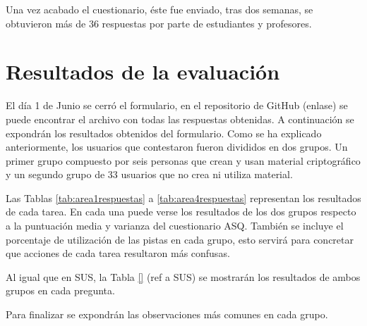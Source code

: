 Una vez acabado el cuestionario, éste fue enviado, tras dos semanas, se obtuvieron más de 36 respuestas por parte de estudiantes y profesores. 


\section{Resultados de la evaluación}
\label{eva:res}

El día 1 de Junio se cerró el formulario, en el repositorio de GitHub (enlase) se puede encontrar el archivo con todas las respuestas obtenidas. A continuación se expondrán los resultados obtenidos del formulario. Como se ha explicado anteriormente, los usuarios que contestaron fueron divididos en dos grupos. Un primer grupo compuesto por seis personas que crean y usan material criptográfico y un segundo grupo de 33 usuarios que no crea ni utiliza material. 


Las Tablas \ref{tab:area1respuestas} a \ref{tab:area4respuestas} representan los resultados de cada tarea. En cada una puede verse los resultados de los dos grupos respecto a la puntuación media y varianza del cuestionario ASQ. También se incluye el porcentaje de utilización de las pistas en cada grupo, esto servirá para concretar que acciones de cada tarea resultaron más confusas.

Al igual que en SUS,  la Tabla \ref{} (ref a SUS) se mostrarán los resultados de ambos grupos en cada pregunta. 

Para finalizar se expondrán las observaciones más comunes en cada grupo.

